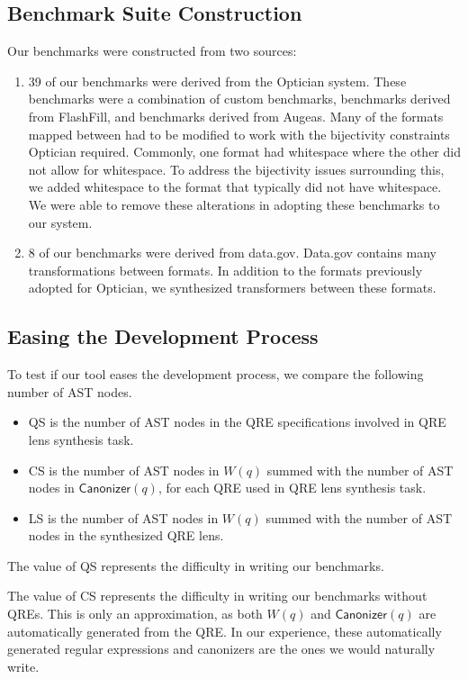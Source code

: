 \documentclass{svproc}
\newcommand{\kw}[1]{\ensuremath{\mathsf{#1}}}
\newcommand{\canonizer}{\ensuremath{\kw{Canonizer}}}
\newcommand{\QRESize}{QS}
\newcommand{\CanonizerAndSpecSize}{CS}
\newcommand{\LensAndSpecSize}{LS}
\begin{document}
\subsection{Benchmark Suite Construction} 
Our benchmarks were constructed from two sources:
\begin{enumerate}
\item 39 of our benchmarks were derived from the Optician system.  These
  benchmarks were a combination of custom benchmarks, benchmarks derived from
  FlashFill, and benchmarks derived from Augeas.  Many of the formats mapped
  between had to be modified to work with the bijectivity constraints
  Optician required.  Commonly, one format had whitespace where the other did
  not allow for whitespace.  To address the bijectivity issues surrounding this,
  we added whitespace to the format that typically did not have whitespace.  We
  were able to remove these alterations in adopting these benchmarks to our
  system.

\item 8 of our benchmarks were derived from data.gov.  Data.gov contains
  many transformations between formats.  In addition to the formats previously
  adopted for Optician, we synthesized transformers between these formats.
\end{enumerate}

\subsection{Easing the Development Process}

To test if our tool eases the development process, we compare the following
number of AST nodes.
%
\begin{itemize}
\item[\QRESize{}] \QRESize{} is the number of AST nodes in the QRE
  specifications involved in QRE lens synthesis task.
\item[\CanonizerAndSpecSize{}] \CanonizerAndSpecSize{} is the number of
  AST nodes in $W(q)$ summed with the number of AST nodes in $\canonizer(q)$,
  for each QRE used in QRE lens synthesis task.
\item[\LensAndSpecSize{}] \LensAndSpecSize{} is the number of AST nodes
  in $W(q)$ summed with the number of AST nodes in the synthesized QRE lens.
\end{itemize}

The value of \QRESize{} represents the difficulty in writing our benchmarks.

The value of \CanonizerAndSpecSize{} represents the difficulty in writing our
benchmarks without QREs.  This is only an approximation, as both $W(q)$ and
$\canonizer(q)$ are automatically generated from the QRE.  In our
experience, these automatically generated regular expressions and canonizers are
the ones we would naturally write.
\end{document}
